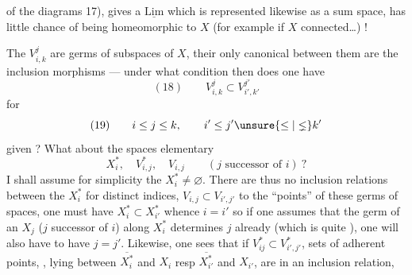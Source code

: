 of the diagrams 17), gives a $\underline{\mathrm{Lim}}$ which is
represented likewise as a sum space, has little
chance of being homeomorphic to $X$ (for example if $X$ connected\ldots) !

The $V_{i,k}^j$ are germs of subspaces
of $X$, their only canonical  
between them are the inclusion morphisms
— under what condition then does one have
\[
(18)\qquad V_{i,k}^j\subset V_{i',k'}^{j'}
\]
for
\[
(19)\qquad i\leq j\leq k,\qquad i'\leq j'\unsure{\leq|\lneq}k'
\]
given ? What about the spaces
elementary
\[
X_i^*,\quad V_{i,j}^*,\quad V_{i,j}\qquad(j\text{ successor of }i)\ ?
\]
I shall assume for simplicity the $X_i^*\ne\varnothing$.
There are thus no inclusion relations between
the $X_i^*$ for distinct indices,  
$V_{i,j}\subset V_{i',j'}$  to the ``points''  of these germs
of spaces, one must have $X_i^*\subset X_{i'}^*$ whence $i=i'$
so if one assumes that the germ of an
$X_j$ ($j$ successor of $i$) along $X_i^*$ determines
$j$ already (which is quite ), one
will also have to have $j=j'$. Likewise, one sees that
if $V_{ij}^*\subset V_{i',j'}^*$,  sets of adherent points,
, lying between $\overline{X_i^*}$ and $X_i$
resp $\overline{X_{i'}^*}$ and $X_{i'}$, are in an inclusion relation,
